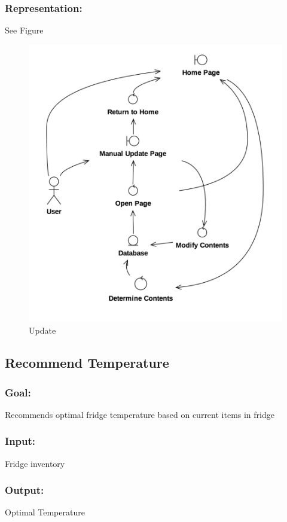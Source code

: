 		\subsubsection{Representation:} See Figure~\thesubsection
		\begin{figure}[p]
			\centering
			\includegraphics[width=\textwidth]{manualup.png}
			\caption{ Update}
		\end{figure}
	\subsection{Recommend Temperature}
		\subsubsection{Goal:} Recommends optimal fridge temperature based on current items in fridge
		\subsubsection{Input:} Fridge inventory
		\subsubsection{Output:} Optimal Temperature 
